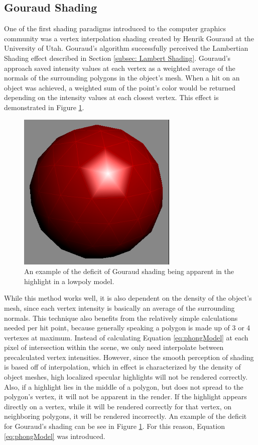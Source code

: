 \subsection{Gouraud Shading}
\label{subsec: Gouraud Shading}
One of the first shading paradigms introduced to the computer graphics community was a vertex interpolation shading created by Henrik Gouraud at the University of Utah\cite{gouraud1971}.  Gouraud's algorithm successfully perceived the Lambertian Shading effect described in Section \ref{subsec: Lambert Shading}.  Gouraud's approach saved intensity values at each vertex as a weighted average of the normals of the surrounding polygons in the object's mesh.  When a hit on an object was achieved, a weighted sum of the point's color would be returned depending on the intensity values at each closest vertex.  This effect is demonstrated in Figure \ref{fig:gouraudMaya}.
\begin{figure}[h]
\centering
\includegraphics[height=3.0in]{figures/gouraud_low.png}
\caption{An example of the deficit of Gouraud shading being apparent in the highlight in a lowpoly model.\cite{GouraudLow} }
\label{fig:gouraudMaya}
\end{figure}

While this method works well,  it is also dependent on the density of the object's mesh, since each vertex intensity is basically an average of the surrounding normals.  This technique also benefits from the relatively simple calculations needed per hit point, because generally speaking a polygon is made up of 3 or 4 vertexes at maximum.  Instead of calculating Equation \ref{eq:phongModel} at each pixel of intersection within the scene, we only need interpolate between precalculated vertex intensities.  However, since the smooth perception of shading is based off of interpolation, which in effect is characterized by the density of object meshes, high localized specular highlights will not be rendered correctly.  Also, if a highlight lies in the middle of a polygon, but does not spread to the polygon's vertex, it will not be apparent in the render.  If the highlight appears directly on a vertex, while it will be rendered correctly for that vertex, on neighboring polygons, it will be rendered incorrectly. An example of the deficit for Gouraud's shading can be see in Figure \ref{fig:gouraudMaya}.  For this reason, Equation \ref{eq:phongModel} was introduced.

